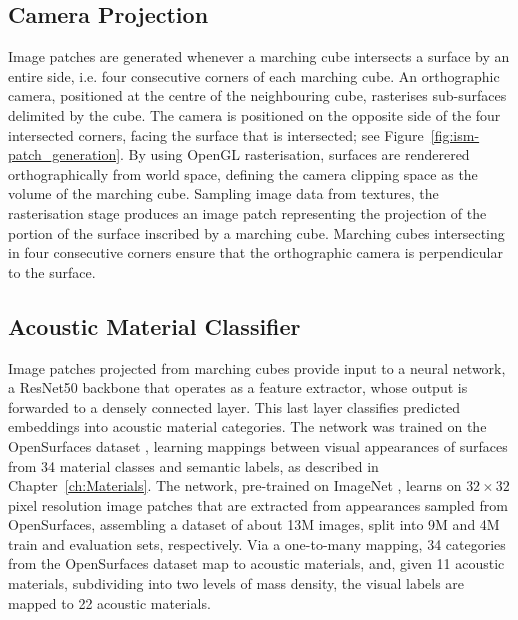 \subsection{Camera Projection}
Image patches are generated whenever a marching cube intersects a surface by an entire side, i.e. four consecutive corners of each marching cube. An orthographic camera, positioned at the centre of the neighbouring cube, rasterises sub-surfaces delimited by the cube. The camera is positioned on the opposite side of the four intersected corners, facing the surface that is intersected; see Figure~\ref{fig:ism-patch_generation}. 
By using OpenGL rasterisation, surfaces are renderered orthographically from world space, defining the camera clipping space as the volume of the marching cube. Sampling image data from textures, the rasterisation stage produces an image patch representing the projection of the portion of the surface inscribed by a marching cube. Marching cubes intersecting in four consecutive corners ensure that the orthographic camera is perpendicular to the surface.\par

\subsection{Acoustic Material Classifier}
Image patches projected from marching cubes provide input to a neural network, a ResNet50 \citep{he2016deep} backbone that operates as a feature extractor, whose output is forwarded to a densely connected layer. This last layer classifies predicted embeddings into acoustic material categories. The network was trained on the OpenSurfaces dataset \citep{bell2013opensurfaces}, learning mappings between visual appearances of surfaces from 34 material classes and semantic labels, as described in Chapter~\ref{ch:Materials}. The network, pre-trained on ImageNet \citep{deng2009imagenet}, learns on $32\times32$ pixel resolution image patches that are extracted from appearances sampled from OpenSurfaces, assembling a dataset of about 13M images, split into 9M and 4M train and evaluation sets, respectively. Via a one-to-many mapping, 34 categories from the OpenSurfaces dataset map to acoustic materials, and, given 11 acoustic materials, subdividing into two levels of mass density, the visual labels are mapped to 22 acoustic materials.\par

